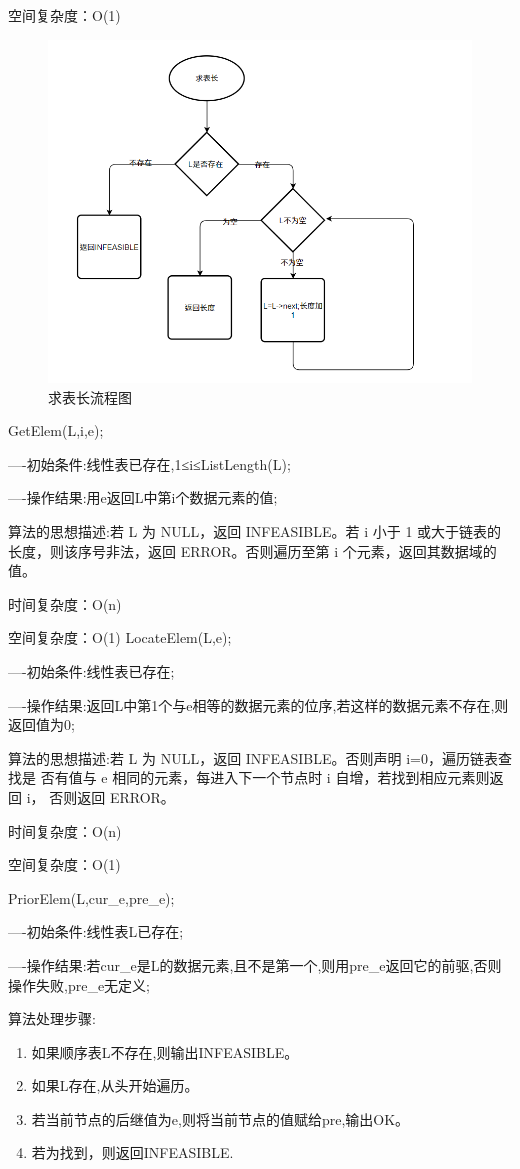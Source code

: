 \documentclass[supercite]{Experimental_Report}
\theoremstyle{definition}
\begin{document}
空间复杂度：O(1)
\begin{figure}[H] %
	\begin{center}
		\includegraphics[width=0.8\linewidth]{images/1.2.4.png}
		\caption{求表长流程图}
	\end{center}
\end{figure}
GetElem(L,i,e);

----初始条件:线性表已存在,1≤i≤ListLength(L);

----操作结果:用e返回L中第i个数据元素的值;

算法的思想描述:若 L 为 NULL，返回 INFEASIBLE。若 i 小于 1 或大于链表的长度，则该序号非法，返回 ERROR。否则遍历至第 i 个元素，返回其数据域的值。	

时间复杂度：O(n)

空间复杂度：O(1)
LocateElem(L,e);

----初始条件:线性表已存在;

----操作结果:返回L中第1个与e相等的数据元素的位序,若这样的数据元素不存在,则返回值为0;

算法的思想描述:若 L 为 NULL，返回 INFEASIBLE。否则声明 i=0，遍历链表查找是
否有值与 e 相同的元素，每进入下一个节点时 i 自增，若找到相应元素则返回 i，
否则返回 ERROR。

时间复杂度：O(n)

空间复杂度：O(1)

PriorElem(L,cur\_e,pre\_e);

----初始条件:线性表L已存在;

----操作结果:若cur\_e是L的数据元素,且不是第一个,则用pre\_e返回它的前驱,否则操作失败,pre\_e无定义;

算法处理步骤:
\begin{enumerate}
	\renewcommand{\labelenumi}{\theenumi)}
	\item 如果顺序表L不存在,则输出INFEASIBLE。
	\item 如果L存在,从头开始遍历。
	\item 若当前节点的后继值为e,则将当前节点的值赋给pre,输出OK。
	\item 若为找到，则返回INFEASIBLE.
\end{enumerate}
\end{document}
